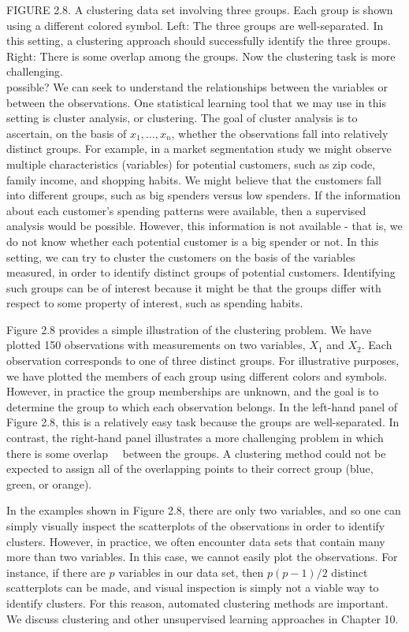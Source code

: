 \documentclass[10pt]{article}
\begin{document}
FIGURE 2.8. A clustering data set involving three groups. Each group is shown using a different colored symbol. Left: The three groups are well-separated. In this setting, a clustering approach should successfully identify the three groups. Right: There is some overlap among the groups. Now the clustering task is more challenging.\\
possible? We can seek to understand the relationships between the variables or between the observations. One statistical learning tool that we may use in this setting is cluster analysis, or clustering. The goal of cluster analysis is to ascertain, on the basis of $x_{1}, \ldots, x_{n}$, whether the observations fall into relatively distinct groups. For example, in a market segmentation study we might observe multiple characteristics (variables) for potential customers, such as zip code, family income, and shopping habits. We might believe that the customers fall into different groups, such as big spenders versus low spenders. If the information about each customer's spending patterns were available, then a supervised analysis would be possible. However, this information is not available - that is, we do not know whether each potential customer is a big spender or not. In this setting, we can try to cluster the customers on the basis of the variables measured, in order to identify distinct groups of potential customers. Identifying such groups can be of interest because it might be that the groups differ with respect to some property of interest, such as spending habits.

Figure 2.8 provides a simple illustration of the clustering problem. We have plotted 150 observations with measurements on two variables, $X_{1}$ and $X_{2}$. Each observation corresponds to one of three distinct groups. For illustrative purposes, we have plotted the members of each group using different colors and symbols. However, in practice the group memberships are unknown, and the goal is to determine the group to which each observation belongs. In the left-hand panel of Figure 2.8, this is a relatively easy task because the groups are well-separated. In contrast, the right-hand panel illustrates a more challenging problem in which there is some overlap\
\
between the groups. A clustering method could not be expected to assign all of the overlapping points to their correct group (blue, green, or orange).

In the examples shown in Figure 2.8, there are only two variables, and so one can simply visually inspect the scatterplots of the observations in order to identify clusters. However, in practice, we often encounter data sets that contain many more than two variables. In this case, we cannot easily plot the observations. For instance, if there are $p$ variables in our data set, then $p(p-1) / 2$ distinct scatterplots can be made, and visual inspection is simply not a viable way to identify clusters. For this reason, automated clustering methods are important. We discuss clustering and other unsupervised learning approaches in Chapter 10.
\end{document}
